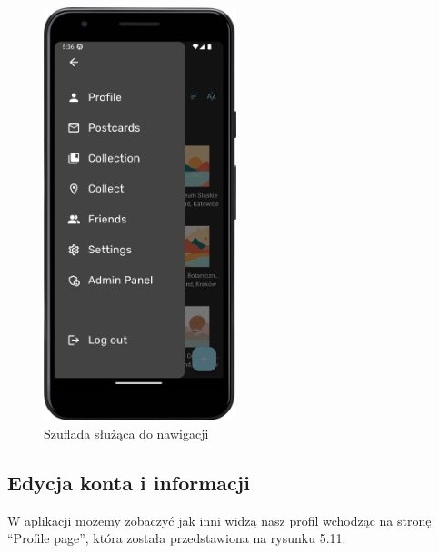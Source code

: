\documentclass[a4paper,twoside,12pt]{book}
\begin{document}
\begin{figure}[H]
    \centering
    \includegraphics[width=0.5\textwidth]{mobile_ss/szuflada.png}
    \caption{Szuflada służąca do nawigacji}
\end{figure}
\newpage
\subsection{Edycja konta i informacji}
W aplikacji możemy zobaczyć jak inni widzą nasz profil wchodząc na stronę ``Profile page'', która została przedstawiona na rysunku 5.11.
\end{document}

